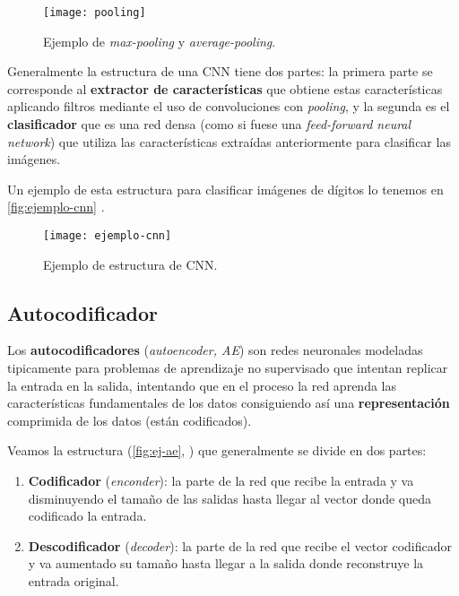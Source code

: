 \begin{figure}[htpb]
  \centering
  \texttt{[image: pooling]}
  \caption{Ejemplo de \emph{max-pooling} y \emph{average-pooling}.}
  \label{fig:pooling}
\end{figure}

Generalmente la estructura de una CNN tiene dos partes: la primera parte se corresponde al \textbf{extractor de características} que obtiene estas características aplicando filtros mediante el uso de convoluciones con \emph{pooling}, y la segunda es el \textbf{clasificador} que es una red densa (como si fuese una \emph{feed-forward neural network}) que utiliza las características extraídas anteriormente para clasificar las imágenes.

Un ejemplo de esta estructura para clasificar imágenes de dígitos lo tenemos en \autoref{fig:ejemplo-cnn} \cite{saha2018cnn}.

\begin{figure}[htpb]
  \centering
  \texttt{[image: ejemplo-cnn]}
  \caption{Ejemplo de estructura de CNN.}
  \label{fig:ejemplo-cnn}
\end{figure}

\subsection{Autocodificador}

Los \textbf{autocodificadores} (\emph{autoencoder, AE}) \cite{mcclelland1986parallel} son redes neuronales modeladas tipicamente para problemas de aprendizaje no supervisado que intentan replicar la entrada en la salida, intentando que en el proceso la red aprenda las características fundamentales de los datos consiguiendo así una \textbf{representación} comprimida de los datos (están codificados).

Veamos la estructura (\autoref{fig:ej-ae}, \cite{sancho2020ae}) que generalmente se divide en dos partes:

\begin{enumerate}
  \item \textbf{Codificador} (\emph{enconder}): la parte de la red que recibe la entrada y va disminuyendo el tamaño de las salidas hasta llegar al vector donde queda codificado la entrada.
  \item \textbf{Descodificador} (\emph{decoder}): la parte de la red que recibe el vector codificador y va aumentado su tamaño hasta llegar a la salida donde reconstruye la entrada original.
\end{enumerate}

